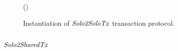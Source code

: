 \begin{figure}
\begin{center}
{\begin{varwidth}{\textwidth}
{            \procVerfProof{\varProofBob}  \< \< \\
            \varSigAlice \opFunResult {} \< \< \\
            \varSigFin \opFunResult \procFinSig{\varSigAlice}{\varSigBob} \< \< \\
            \varExcess \opAssign {} \opAddPoint {} \< \< \\
            \pcreturn \varTx \opAssign \varTx \opUnion (\varExcess \opSeperate \varSigFin)
            }
        \end{varwidth}
        }
    \end{center}
    \caption{Instantiation of $\mathit{Solo2SoloTx}$ transaction protocol. \label{fig:solo2solotx}}
\end{figure}

\subsection{$\mathit{Solo2SharedTx}$}

